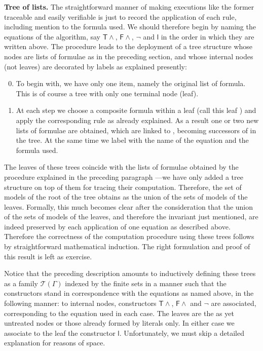 \documentclass[a4paper,UKenglish]{lipics}
\newcounter{c}
\newcommand{\nentry}[1]{\noindent\textbf{#1}}
\newcommand{\ruleq}[1]{\ensuremath{\mathsf{#1}}}
\newcommand{\ttabl}[1]{\ensuremath{\mathcal{T}({#1})}}
\begin{document}
\nentry{Tree of lists.} The straightforward manner of making executions like the former traceable and easily verifiable is just to record the application of each rule, including mention to the formula used. We should therefore begin by naming the equations of the algorithm, say \ruleq{T\wedge}, \ruleq{F\wedge}, \ruleq{\neg} and \ruleq{l} in the order in which they are written above.
\noindent The procedure leads to the deployment of a tree structure whose nodes are lists of formulae as in the preceding section, and whose internal nodes (not leaves) are decorated by labels as explained presently: \begin{enumerate}  \setcounter{enumi}{-1}
\item To begin with, we have only one item, namely the original list of formula. This is of course a tree with only one terminal node (leaf).
\item At each step we choose a composite formula within a leaf (call this leaf ) and apply the corresponding rule as already explained. As a result one or two new lists of formulae are obtained, which are linked to , becoming successors of  in the tree. At the same time we label  with the name of the equation and the formula used.
\end{enumerate}
The leaves of these trees coincide with the lists of formulae obtained by the procedure explained in the preceding paragraph ---we have only added a tree structure on top of them for tracing their computation. Therefore, the set of models of the root of the tree obtains as the union of the sets of models of the leaves. Formally, this much becomes clear after the consideration that the union of the sets of models of the leaves, and therefore the invariant just mentioned, are indeed preserved by each application of one equation as described above. Therefore the correctness of the
computation procedure using these trees follows by straightforward mathematical induction. The right formulation and proof of this result is left as exercise.

Notice that the preceding description amounts to inductively defining these trees as a family \ttabl{\Gamma} indexed by the finite sets  in a manner such that the constructors stand in correspondence with the equations as named above, in the following manner: to internal nodes, constructors \ruleq{T\wedge}, \ruleq{F\wedge} and \ruleq{\neg} 
are associated, corresponding to the equation used in each case. The leaves are the as yet untreated nodes or those already formed by literals only. In either case we associate to the leaf the constructor \ruleq{l}. Unfortunately, we must skip a detailed explanation for reasons of space.
\end{document}
